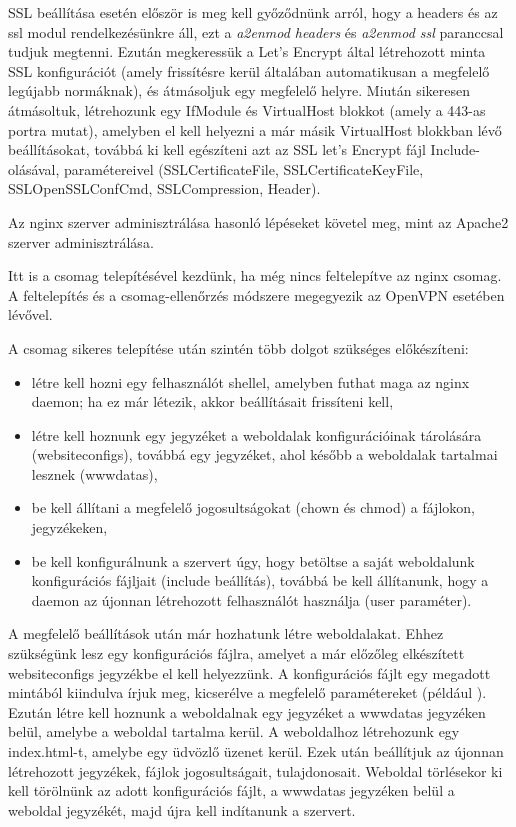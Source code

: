 SSL beállítása esetén először is meg kell győződnünk arról, hogy a headers és az ssl modul rendelkezésünkre áll, ezt a \textit{a2enmod headers} és \textit{a2enmod ssl} paranccsal tudjuk megtenni. Ezután megkeressük a Let's Encrypt által létrehozott minta SSL konfigurációt (amely frissítésre kerül általában automatikusan a megfelelő legújabb normáknak), és átmásoljuk egy megfelelő helyre. Miután sikeresen átmásoltuk, létrehozunk egy IfModule és VirtualHost blokkot (amely a 443-as portra mutat), amelyben el kell helyezni a már másik VirtualHost blokkban lévő beállításokat, továbbá ki kell egészíteni azt az SSL let's Encrypt fájl Include-olásával, paramétereivel (SSLCertificateFile, SSLCertificateKeyFile, SSLOpenSSLConfCmd, SSLCompression, Header).

\pagebreak


Az nginx szerver adminisztrálása hasonló lépéseket követel meg, mint az Apache2 szerver adminisztrálása.

Itt is a csomag telepítésével kezdünk, ha még nincs feltelepítve az nginx csomag. A feltelepítés és a csomag-ellenőrzés módszere megegyezik az OpenVPN esetében lévővel.

A csomag sikeres telepítése után szintén több dolgot szükséges előkészíteni:
\begin{itemize}
	\item létre kell hozni egy felhasználót \textit{} shellel, amelyben futhat maga az nginx daemon; ha ez már létezik, akkor beállításait frissíteni kell,
	\item létre kell hoznunk egy jegyzéket a weboldalak konfigurációinak tárolására (websiteconfigs), továbbá egy jegyzéket, ahol később a weboldalak tartalmai lesznek (wwwdatas),
	\item be kell állítani a megfelelő jogosultságokat (chown és chmod) a fájlokon, jegyzékeken,
	\item be kell konfigurálnunk a szervert úgy, hogy betöltse a saját weboldalunk konfigurációs fájljait (include beállítás), továbbá be kell állítanunk, hogy a daemon az újonnan létrehozott felhasználót használja (user paraméter).
\end{itemize}

A megfelelő beállítások után már hozhatunk létre weboldalakat. Ehhez szükségünk lesz egy konfigurációs fájlra, amelyet a már előzőleg elkészített websiteconfigs jegyzékbe el kell helyezzünk. A konfigurációs fájlt egy megadott mintából kiindulva írjuk meg, kicserélve a megfelelő paramétereket (például ). Ezután létre kell hoznunk a weboldalnak egy jegyzéket a wwwdatas jegyzéken belül, amelybe a weboldal tartalma kerül. A weboldalhoz létrehozunk egy index.html-t, amelybe egy üdvözlő üzenet kerül. Ezek után beállítjuk az újonnan létrehozott jegyzékek, fájlok jogosultságait, tulajdonosait. Weboldal törlésekor ki kell törölnünk az adott konfigurációs fájlt, a wwwdatas jegyzéken belül a weboldal jegyzékét, majd újra kell indítanunk a szervert.

